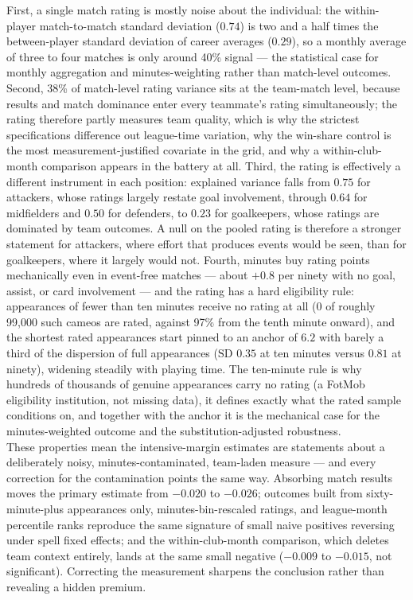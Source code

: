 \documentclass{article}
\begin{document}
First, a single match rating is mostly noise about the individual: the
within-player match-to-match standard deviation ($0.74$) is two and a half
times the between-player standard deviation of career averages ($0.29$), so
a monthly average of three to four matches is only around 40\% signal ---
the statistical case for monthly aggregation and minutes-weighting rather
than match-level outcomes. Second, 38\% of match-level rating variance sits
at the team-match level, because results and match dominance enter every
teammate's rating simultaneously; the rating therefore partly measures team
quality, which is why the strictest specifications difference out
league-time variation, why the win-share control is the most
measurement-justified covariate in the grid, and why a within-club-month
comparison appears in the battery at all. Third, the rating is effectively a
different instrument in each position: explained variance falls from $0.75$
for attackers, whose ratings largely restate goal involvement, through
$0.64$ for midfielders and $0.50$ for defenders, to $0.23$ for goalkeepers,
whose ratings are dominated by team outcomes. A null on the pooled rating is
therefore a stronger statement for attackers, where effort that produces
events would be seen, than for goalkeepers, where it largely would not.
Fourth, minutes buy rating points mechanically even in event-free matches
--- about $+0.8$ per ninety with no goal, assist, or card involvement ---
and the rating has a hard eligibility rule: appearances of fewer than ten
minutes receive no rating at all (0 of roughly 99{,}000 such cameos are
rated, against 97\% from the tenth minute onward), and the shortest rated
appearances start pinned to an anchor of $6.2$ with barely a third of the
dispersion of full appearances ($\mathrm{SD}$ $0.35$ at ten minutes versus
$0.81$ at ninety), widening steadily with playing time. The ten-minute rule
is why hundreds of thousands of genuine appearances carry no rating (a
FotMob eligibility institution, not missing data), it defines exactly what
the rated sample conditions on, and together with the anchor it is the
mechanical case for the minutes-weighted outcome and the
substitution-adjusted robustness. \\

These properties mean the intensive-margin estimates are statements about a
deliberately noisy, minutes-contaminated, team-laden measure --- and every
correction for the contamination points the same way. Absorbing match
results moves the primary estimate from $-0.020$ to $-0.026$; outcomes built
from sixty-minute-plus appearances only, minutes-bin-rescaled ratings, and
league-month percentile ranks reproduce the same signature of small naive
positives reversing under spell fixed effects; and the within-club-month
comparison, which deletes team context entirely, lands at the same small
negative ($-0.009$ to $-0.015$, not significant). Correcting the measurement
sharpens the conclusion rather than revealing a hidden premium.
\end{document}
